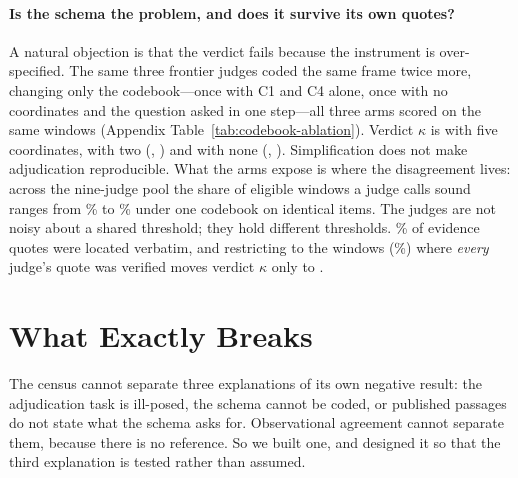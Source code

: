 \documentclass[11pt]{article}
\begin{document}
\paragraph{Is the schema the problem, and does it survive its own quotes?}
A natural objection is that the verdict fails because the instrument is
over-specified. The same three frontier judges coded the same frame twice more,
changing only the codebook---once with C1 and C4 alone, once with no coordinates
and the question asked in one step---all three arms scored on the same
\AblItems{} windows (Appendix Table~\ref{tab:codebook-ablation}). Verdict
$\kappa$ is \AblFiveK{} with five coordinates, \AblCFourK{} with two
(\AblCFourDelta{}, \AblCFourCI{}) and \AblDirectK{} with none
(\AblDirectDelta{}, \AblDirectCI{}). Simplification does not make adjudication
reproducible. What the arms expose is where the disagreement lives: across the
nine-judge pool the share of eligible windows a judge calls sound ranges from
\TierSurvivesLo\% to \TierSurvivesHi\% under one codebook on identical items.
The judges are not noisy about a shared threshold; they hold different
thresholds. \CensusQuoteRate\% of evidence quotes were located verbatim, and
restricting to the \QuoteVerifiedN{} windows (\QuoteVerifiedPct\%) where
\emph{every} judge's quote was verified moves verdict $\kappa$ only to
\QuoteVerdictK{}.

\section{What Exactly Breaks}
\label{sec:instrument}

The census cannot separate three explanations of its own negative result: the
adjudication task is ill-posed, the schema cannot be coded, or published
passages do not state what the schema asks for. Observational agreement cannot
separate them, because there is no reference. So we built one, and designed it
so that the third explanation is tested rather than assumed.
\end{document}
